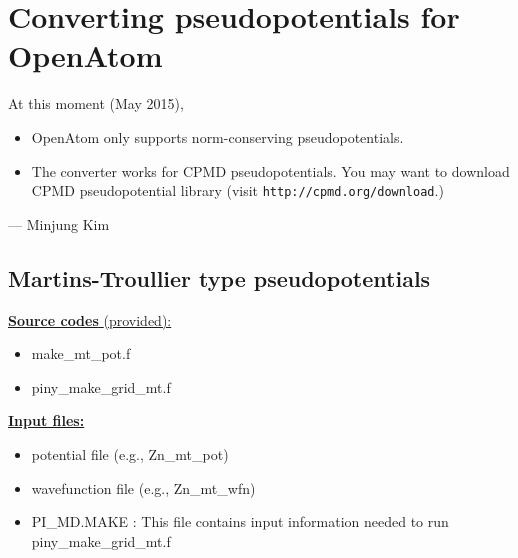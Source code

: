 %
%
%
%
%
%
%
%
%

\section{Converting pseudopotentials for OpenAtom}


At this moment (May 2015),
\begin{itemize}
\item OpenAtom only supports norm-conserving pseudopotentials.
\item The converter works for CPMD pseudopotentials. You may want to download CPMD pseudopotential library (visit \verb+http://cpmd.org/download+.)
\end{itemize}
--- Minjung Kim

\subsection{Martins-Troullier type pseudopotentials}


\noindent
\underline{ {\bf Source codes }(provided): }
	\begin{itemize}
	\item make{\_}mt{\_}pot.f
	\item piny{\_}make{\_}grid{\_}mt.f
	\end{itemize}
	
\vskip 12pt
\noindent
\underline{ {\bf Input files:} }
	\begin{itemize}
	\item potential file (e.g., Zn{\_}mt{\_}pot)
	\item wavefunction file (e.g., Zn{\_}mt{\_}wfn)
	\item PI{\_}MD.MAKE : This file contains input information needed to run piny{\_}make{\_}grid{\_}mt.f
	\end{itemize}

